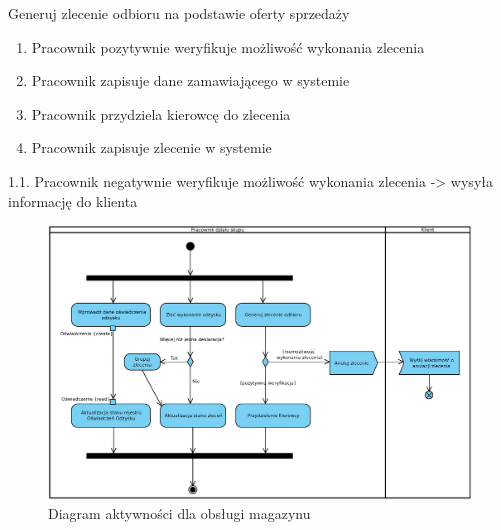 	\begin{usecase}{Generuj zlecenie odbioru na podstawie oferty sprzedaży}
		\author{Beata Obrok} 
		\maketitle
\begin{scenario} 
			\begin{enumerate}
				\item Pracownik pozytywnie weryfikuje możliwość wykonania zlecenia
				\item Pracownik zapisuje dane zamawiającego w systemie
				\item Pracownik przydziela kierowcę do zlecenia
				\item Pracownik zapisuje zlecenie w systemie
			\end{enumerate}
		\end{scenario}
\begin{extensions}
				1.1. Pracownik negatywnie weryfikuje możliwość wykonania zlecenia -> wysyła informację do klienta
	\end{extensions}
\end{usecase}

	\begin{figure}[H]
		\centering
		\includegraphics[width=.9\textwidth]{img/AD/skup.eps}
		\caption{Diagram aktywności dla obsługi magazynu}
	\end{figure}

